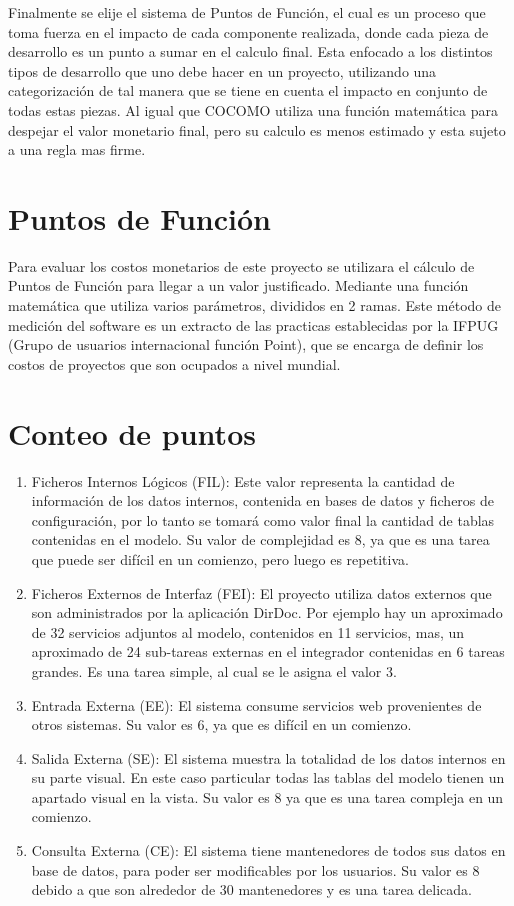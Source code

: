 \documentclass[a4paper,12pt,openany,oneside]{book}
\begin{document}
Finalmente se elije el sistema de Puntos de Función, el cual es un proceso que toma fuerza en el impacto de cada componente realizada, donde cada pieza de desarrollo es un punto a sumar en el calculo final. Esta enfocado a los distintos tipos de desarrollo que uno debe hacer en un proyecto, utilizando una categorización de tal manera que se tiene en cuenta el impacto en conjunto de todas estas piezas. Al igual que COCOMO utiliza una función matemática para despejar el valor monetario final, pero su calculo es menos estimado y esta sujeto a una regla mas firme.
\section{Puntos de Función}
Para evaluar los costos monetarios de este proyecto se utilizara el cálculo de Puntos de Función para llegar a un valor justificado. Mediante una función matemática que utiliza varios parámetros, divididos en 2 ramas. Este método de medición del software es un extracto de las practicas establecidas por la IFPUG (Grupo de usuarios internacional función Point), que se encarga de definir los costos de proyectos que son ocupados a nivel mundial.

\section{Conteo de puntos}

\begin{enumerate}
	\item Ficheros Internos Lógicos (FIL): Este valor representa la cantidad de información de los datos internos, contenida en bases de datos y ficheros de configuración, por lo tanto se tomará como valor final la cantidad de tablas contenidas en el modelo. Su valor de complejidad es 8, ya que es una tarea que puede ser difícil en un comienzo, pero luego es repetitiva.
	\item Ficheros Externos de Interfaz (FEI): El proyecto utiliza datos externos que son administrados por la aplicación DirDoc. Por ejemplo hay un aproximado de 32 servicios adjuntos al modelo, contenidos en 11 servicios, mas, un aproximado de 24 sub-tareas externas en el integrador contenidas en 6 tareas grandes. Es una tarea simple, al cual se le asigna el valor 3.
	\item Entrada Externa (EE): El sistema consume servicios web provenientes de otros sistemas. Su valor es 6, ya que es difícil en un comienzo.
	\item Salida Externa (SE): El sistema muestra la totalidad de los datos internos en su parte visual. En este caso particular todas las tablas del modelo tienen un apartado visual en la vista. Su valor es 8 ya que es una tarea compleja en un comienzo.
	\item Consulta Externa (CE): El sistema tiene mantenedores de todos sus datos en base de datos, para poder ser modificables por los usuarios. Su valor es 8 debido a que son alrededor de 30 mantenedores y es una tarea delicada.
\end{enumerate}
\end{document}
